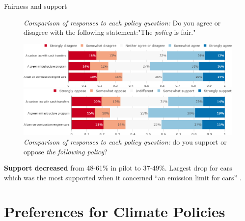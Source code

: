 \documentclass[aspectratio=169,9pt,dvipsnames]{beamer}
\begin{document}
\begin{frame}{Fairness and support}%
\begin{figure}[h!]
\vspace{-.1cm}
\centering
\caption{\textit{Comparison of responses to each policy question:} Do you agree or disagree with the following statement:"The \textit{policy} is fair."}
\includegraphics[width=.8\textwidth]{../figures/US/policies_fair_US.png}
\vspace{-.1cm}
\centering
\caption{\textit{Comparison of responses to each policy question:} do you support or oppose \textit{the following policy}?}
\includegraphics[width=.8\textwidth]{../figures/US/policies_support_US.png}
\end{figure}


\textbf{Support decreased} from 48-61\% in pilot to 37-49\%. Largest drop for cars which was the most supported when it concerned ``an emission limit for cars'' .
\end{frame}

\section{Preferences for Climate Policies}
\end{document}

